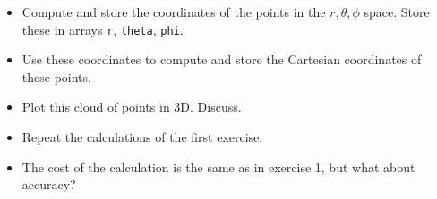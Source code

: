 \begin{itemize}
\item Compute and store the coordinates of the points in the $r,\theta,\phi$ space. Store 
these in arrays {\tt r}, {\tt theta}, {\tt phi}.
\item Use these coordinates to compute and store the Cartesian coordinates of these points. 
\item Plot this cloud of points in 3D. Discuss.
\item Repeat the calculations of the first exercise.
\item The cost of the calculation is the same as in exercise 1, but what about accuracy?
\end{itemize}



